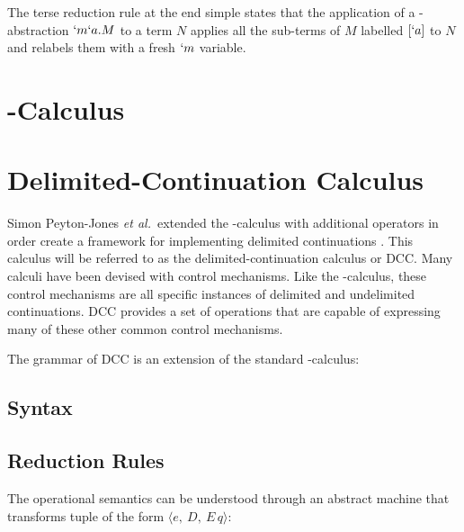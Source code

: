 The terse reduction rule at the end simple states that the application of a \lmu-abstraction $`m`a.M$ to a term $N$ applies all the sub-terms of $M$ labelled $[`a]$ to $N$ and relabels them with a fresh $`m$ variable.

\section{\ltry-Calculus}

\section{Delimited-Continuation Calculus}

  Simon Peyton-Jones \textit{et al.}\ extended the \lam-calculus with additional operators in order create a framework for implementing delimited continuations \cite{JonesDS07}. This calculus will be referred to as the delimited-continuation calculus or DCC. Many calculi have been devised with control mechanisms. Like the \lmu-calculus, these control mechanisms are all specific instances of delimited and undelimited continuations. DCC provides a set of operations that are capable of expressing many of these other common control mechanisms.

  The grammar of DCC is an extension of the standard \lam-calculus:

  \subsection{Syntax}
  \begin{figure}[!h]
  \end{figure}

  \subsection{Reduction Rules}
  The operational semantics can be understood through an abstract machine that transforms tuple of the form $\langle e,\ D,\ E\, q \rangle$:

